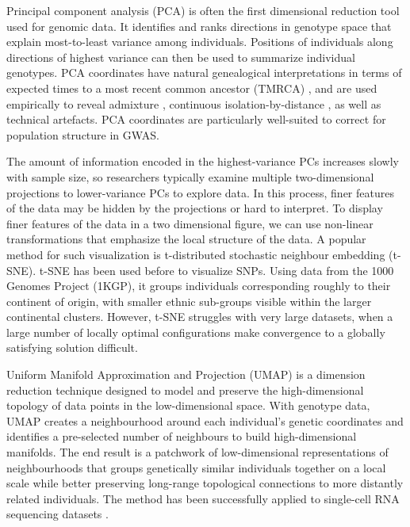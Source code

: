 Principal component analysis (PCA) is often the first dimensional reduction tool used for genomic data. It identifies and ranks directions in genotype space that explain most-to-least variance among individuals. Positions of individuals along directions of highest variance can then be used to summarize individual genotypes. PCA coordinates have natural genealogical interpretations in terms of expected times to a most recent common ancestor (TMRCA) \citep{mcvean2009genealogical}, and are used empirically to reveal admixture \citep{brisbin2012pcadmix}, continuous isolation-by-distance \citep{novembre2008europe, nelson2008population}, as well as technical artefacts. PCA coordinates are particularly well-suited to correct for population structure in GWAS\citep{eigen2006}.

The amount of information encoded in the highest-variance PCs increases slowly with sample size, so researchers typically examine multiple two-dimensional projections to lower-variance PCs to explore data. In this process, finer features of the data may be hidden by the projections or hard to interpret. To display finer features of the data in a two dimensional figure, we can use non-linear transformations that emphasize the local structure of the data. A popular method for such visualization is t-distributed stochastic neighbour embedding (t-SNE)\citep{maaten2008visualizing}. t-SNE has been used before to visualize SNPs\citep{platzer2013visualization}. Using data from the 1000 Genomes Project (1KGP)\citep{10002015global}, it groups individuals corresponding roughly to their continent of origin, with smaller ethnic sub-groups visible within the larger continental clusters\citep{li2017tsne}. However, t-SNE struggles with very large datasets, when a large number of locally optimal configurations make convergence to a globally satisfying solution difficult.

Uniform Manifold Approximation and Projection (UMAP) is a dimension reduction technique designed to model and preserve the high-dimensional topology of data points in the low-dimensional space\citep{2018arXivUMAP}. With genotype data, UMAP creates a neighbourhood around each individual's genetic coordinates and identifies a pre-selected number of neighbours to build high-dimensional manifolds. The end result is a patchwork of low-dimensional representations of neighbourhoods that groups genetically similar individuals together on a local scale while better preserving long-range topological connections to more distantly related individuals. The method has been successfully applied to single-cell RNA sequencing datasets \citep{umap2018singlecell}.

